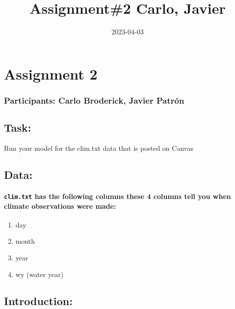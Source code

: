 \documentclass[
]{article}
\title{Assignment\#2 Carlo, Javier}
\author{}
\date{\vspace{-2.5em}2023-04-03}
\begin{document}
\maketitle

\hypertarget{assignment-2}{%
\section{Assignment 2}\label{assignment-2}}

\hypertarget{participants-carlo-broderick-javier-patruxf3n}{%
\subsubsection{Participants: Carlo Broderick, Javier
Patrón}\label{participants-carlo-broderick-javier-patruxf3n}}

\hypertarget{task}{%
\subsection{Task:}\label{task}}

Run your model for the clim.txt data that is posted on Canvas

\hypertarget{data}{%
\subsection{Data:}\label{data}}

\hypertarget{clim.txt-has-the-following-columns-these-4-columns-tell-you-when-climate-observations-were-made}{%
\paragraph{\texorpdfstring{\texttt{clim.txt} has the following columns
these 4 columns tell you when climate observations were
made:}{clim.txt has the following columns these 4 columns tell you when climate observations were made:}}\label{clim.txt-has-the-following-columns-these-4-columns-tell-you-when-climate-observations-were-made}}

\begin{enumerate}
\def\labelenumi{\arabic{enumi}.}
\item
  day
\item
  month
\item
  year
\item
  wy (water year)
\end{enumerate}

\hypertarget{introduction}{%
\subsection{Introduction:}\label{introduction}}
\end{document}
